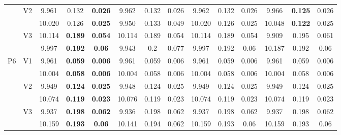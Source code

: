 \documentclass[12pt,a4paper]{article}
\begin{document}
\begin{sidewaystable}[ht]
{\begin{tabular}{cc|ccc|ccc|ccc|ccc|}
   & \multirow{2}{*}{V2} & 9.961 & 0.132 & \textbf{0.026} & 9.962 & 0.132 & 0.026 & 9.962 & 0.132 & 0.026 & 9.966 & \textbf{0.125} & 0.026 \\ 
   &  & 10.020 & 0.126 & \textbf{0.025} & 9.950 & 0.133 & 0.049 & 10.020 & 0.126 & 0.025 & 10.048 & \textbf{0.122} & 0.025 \\ 
   & \multirow{2}{*}{V3} & 10.114 & \textbf{0.189} & \textbf{0.054} & 10.114 & 0.189 & 0.054 & 10.114 & 0.189 & 0.054 & 9.909 & 0.195 & 0.061 \\ 
   &  & 9.997 & \textbf{0.192} & \textbf{0.06} & 9.943 & 0.2 & 0.077 & 9.997 & 0.192 & 0.06 & 10.187 & 0.192 & 0.06 \\ 
   \hline \hline\multirow{6}{*}{P6} & \multirow{2}{*}{V1} & 9.961 & \textbf{0.059} & \textbf{0.006} & 9.961 & 0.059 & 0.006 & 9.961 & 0.059 & 0.006 & 9.961 & 0.059 & 0.006 \\ 
   &  & 10.004 & \textbf{0.058} & \textbf{0.006} & 10.004 & 0.058 & 0.006 & 10.004 & 0.058 & 0.006 & 10.004 & 0.058 & 0.006 \\ 
   & \multirow{2}{*}{V2} & 9.949 & \textbf{0.124} & \textbf{0.025} & 9.948 & 0.124 & 0.025 & 9.949 & 0.124 & 0.025 & 9.949 & 0.124 & 0.025 \\ 
   &  & 10.074 & \textbf{0.119} & \textbf{0.023} & 10.076 & 0.119 & 0.023 & 10.074 & 0.119 & 0.023 & 10.074 & 0.119 & 0.023 \\ 
   & \multirow{2}{*}{V3} & 9.937 & \textbf{0.198} & \textbf{0.062} & 9.936 & 0.198 & 0.062 & 9.937 & 0.198 & 0.062 & 9.937 & 0.198 & 0.062 \\ 
   &  & 10.159 & \textbf{0.193} & \textbf{0.06} & 10.141 & 0.194 & 0.062 & 10.159 & 0.193 & 0.06 & 10.159 & 0.193 & 0.06 \\ 
   \hline
\end{tabular}
}
\end{sidewaystable}
\end{document}
